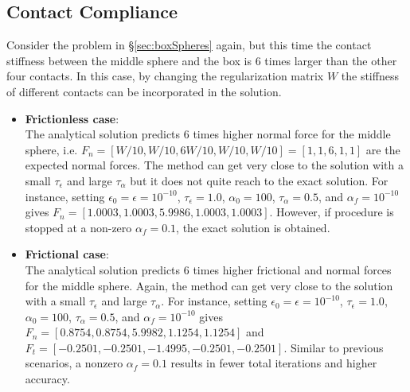 \subsection{Contact Compliance}
Consider the problem in \S\ref{sec:boxSpheres} again, but this time the contact stiffness between the middle sphere and the box is 6 times larger than the other four  contacts.
In this case, by changing the regularization matrix $W$ the stiffness of different contacts can be  incorporated in the solution.
\begin{itemize}
	\item \textbf{Frictionless case}:\\
	The analytical solution predicts 6 times higher normal force for the middle sphere, i.e. $F_n=[ W/10, W/10, 6W/10, W/10, W/10] = [1, 1, 6, 1, 1]$ are the expected normal forces. The method can get very close to the solution with a small $\tau_\epsilon$ and large $\tau_\alpha$ but it does not quite reach to the exact solution. For instance, setting $\epsilon_0=\epsilon=10^{-10}$, $\tau_\epsilon=1.0$, $\alpha_0=100$, $\tau_\alpha=0.5$, and $\alpha_f=10^{-10}$ gives  $F_n=[ 1.0003, 1.0003, 5.9986, 1.0003, 1.0003]$. However, if procedure is stopped at a non-zero $\alpha_f=0.1$, the exact solution is obtained.
	
	\item \textbf{Frictional case}:\\
	The analytical solution predicts 6 times higher frictional and normal forces for the middle sphere.
	Again, the method can get very close to the solution with a small $\tau_\epsilon$ and large $\tau_\alpha$. For instance, setting $\epsilon_0=\epsilon=10^{-10}$, $\tau_\epsilon=1.0$, $\alpha_0=100$, $\tau_\alpha=0.5$, and $\alpha_f=10^{-10}$ gives 
	$F_n=[ 0.8754, 0.8754, 5.9982, 1.1254, 1.1254]$  and 
	$F_t=[-0.2501, -0.2501, -1.4995, -0.2501, -0.2501]$. Similar to previous scenarios, a nonzero $\alpha_f=0.1$ results in fewer total iterations and higher accuracy.	
\end{itemize}

